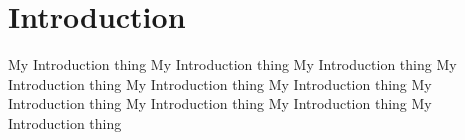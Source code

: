 \section{Introduction}

My Introduction thing
My Introduction thing
My Introduction thing
My Introduction thing
My Introduction thing
My Introduction thing
My Introduction thing
My Introduction thing
My Introduction thing
My Introduction thing